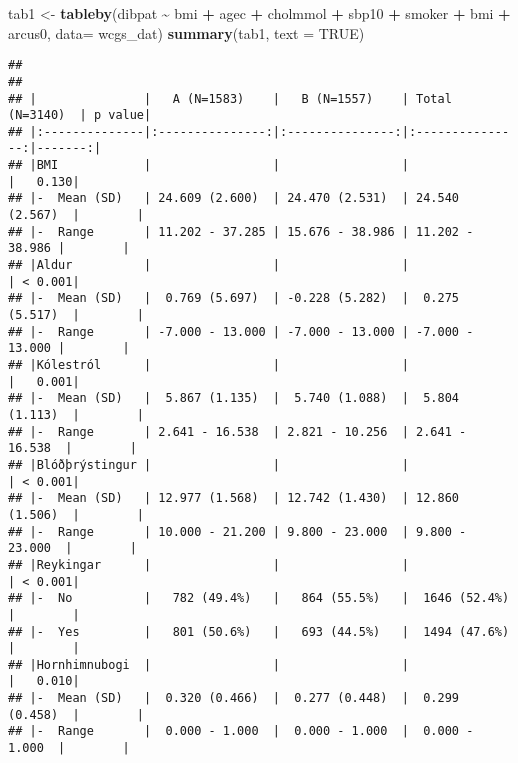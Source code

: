 \documentclass[
]{book}
\newenvironment{Shaded}{\begin{snugshade}}{\end{snugshade}}
\newcommand{\DataTypeTok}[1]{\textcolor[rgb]{0.13,0.29,0.53}{#1}}
\newcommand{\KeywordTok}[1]{\textcolor[rgb]{0.13,0.29,0.53}{\textbf{#1}}}
\newcommand{\NormalTok}[1]{#1}
\newcommand{\OperatorTok}[1]{\textcolor[rgb]{0.81,0.36,0.00}{\textbf{#1}}}
\newcommand{\OtherTok}[1]{\textcolor[rgb]{0.56,0.35,0.01}{#1}}
\newcommand{\StringTok}[1]{\textcolor[rgb]{0.31,0.60,0.02}{#1}}
\begin{document}
\begin{Shaded}
\begin{Highlighting}[]
\NormalTok{tab1 <{-}}\StringTok{ }\KeywordTok{tableby}\NormalTok{(dibpat }\OperatorTok{\textasciitilde{}}\StringTok{ }\NormalTok{bmi }\OperatorTok{+}\StringTok{ }\NormalTok{agec }\OperatorTok{+}\StringTok{ }\NormalTok{cholmmol }\OperatorTok{+}\StringTok{ }\NormalTok{sbp10 }\OperatorTok{+}\StringTok{ }\NormalTok{smoker }\OperatorTok{+}\StringTok{ }\NormalTok{bmi }\OperatorTok{+}\StringTok{ }\NormalTok{arcus0, }\DataTypeTok{data=}\NormalTok{ wcgs\_dat)}
\KeywordTok{summary}\NormalTok{(tab1, }\DataTypeTok{text =} \OtherTok{TRUE}\NormalTok{)}
\end{Highlighting}
\end{Shaded}

\begin{verbatim}
## 
## 
## |               |   A (N=1583)    |   B (N=1557)    | Total (N=3140)  | p value|
## |:--------------|:---------------:|:---------------:|:---------------:|-------:|
## |BMI            |                 |                 |                 |   0.130|
## |-  Mean (SD)   | 24.609 (2.600)  | 24.470 (2.531)  | 24.540 (2.567)  |        |
## |-  Range       | 11.202 - 37.285 | 15.676 - 38.986 | 11.202 - 38.986 |        |
## |Aldur          |                 |                 |                 | < 0.001|
## |-  Mean (SD)   |  0.769 (5.697)  | -0.228 (5.282)  |  0.275 (5.517)  |        |
## |-  Range       | -7.000 - 13.000 | -7.000 - 13.000 | -7.000 - 13.000 |        |
## |Kólestról      |                 |                 |                 |   0.001|
## |-  Mean (SD)   |  5.867 (1.135)  |  5.740 (1.088)  |  5.804 (1.113)  |        |
## |-  Range       | 2.641 - 16.538  | 2.821 - 10.256  | 2.641 - 16.538  |        |
## |Blóðþrýstingur |                 |                 |                 | < 0.001|
## |-  Mean (SD)   | 12.977 (1.568)  | 12.742 (1.430)  | 12.860 (1.506)  |        |
## |-  Range       | 10.000 - 21.200 | 9.800 - 23.000  | 9.800 - 23.000  |        |
## |Reykingar      |                 |                 |                 | < 0.001|
## |-  No          |   782 (49.4%)   |   864 (55.5%)   |  1646 (52.4%)   |        |
## |-  Yes         |   801 (50.6%)   |   693 (44.5%)   |  1494 (47.6%)   |        |
## |Hornhimnubogi  |                 |                 |                 |   0.010|
## |-  Mean (SD)   |  0.320 (0.466)  |  0.277 (0.448)  |  0.299 (0.458)  |        |
## |-  Range       |  0.000 - 1.000  |  0.000 - 1.000  |  0.000 - 1.000  |        |
\end{verbatim}
\end{document}
